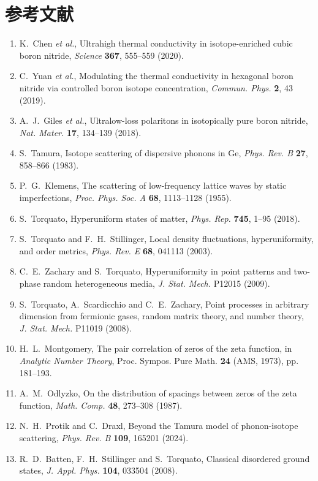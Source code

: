 \documentclass[10pt,twocolumn]{article}
\begin{document}
\section*{参考文献}
{\footnotesize
\begin{enumerate}\itemsep0pt
\item K.~Chen \textit{et al.}, Ultrahigh thermal conductivity in isotope-enriched cubic boron nitride, \textit{Science} \textbf{367}, 555--559 (2020).
\item C.~Yuan \textit{et al.}, Modulating the thermal conductivity in hexagonal boron nitride via controlled boron isotope concentration, \textit{Commun. Phys.} \textbf{2}, 43 (2019).
\item A.~J.~Giles \textit{et al.}, Ultralow-loss polaritons in isotopically pure boron nitride, \textit{Nat. Mater.} \textbf{17}, 134--139 (2018).
\item S.~Tamura, Isotope scattering of dispersive phonons in Ge, \textit{Phys. Rev. B} \textbf{27}, 858--866 (1983).
\item P.~G.~Klemens, The scattering of low-frequency lattice waves by static imperfections, \textit{Proc. Phys. Soc. A} \textbf{68}, 1113--1128 (1955).
\item S.~Torquato, Hyperuniform states of matter, \textit{Phys. Rep.} \textbf{745}, 1--95 (2018).
\item S.~Torquato and F.~H.~Stillinger, Local density fluctuations, hyperuniformity, and order metrics, \textit{Phys. Rev. E} \textbf{68}, 041113 (2003).
\item C.~E.~Zachary and S.~Torquato, Hyperuniformity in point patterns and two-phase random heterogeneous media, \textit{J. Stat. Mech.} P12015 (2009).
\item S.~Torquato, A.~Scardicchio and C.~E.~Zachary, Point processes in arbitrary dimension from fermionic gases, random matrix theory, and number theory, \textit{J. Stat. Mech.} P11019 (2008).
\item H.~L.~Montgomery, The pair correlation of zeros of the zeta function, in \textit{Analytic Number Theory}, Proc. Sympos. Pure Math. \textbf{24} (AMS, 1973), pp. 181--193.
\item A.~M.~Odlyzko, On the distribution of spacings between zeros of the zeta function, \textit{Math. Comp.} \textbf{48}, 273--308 (1987).
\item N.~H.~Protik and C.~Draxl, Beyond the Tamura model of phonon-isotope scattering, \textit{Phys. Rev. B} \textbf{109}, 165201 (2024).
\item R.~D.~Batten, F.~H.~Stillinger and S.~Torquato, Classical disordered ground states, \textit{J. Appl. Phys.} \textbf{104}, 033504 (2008).

\end{enumerate}}
\end{document}
